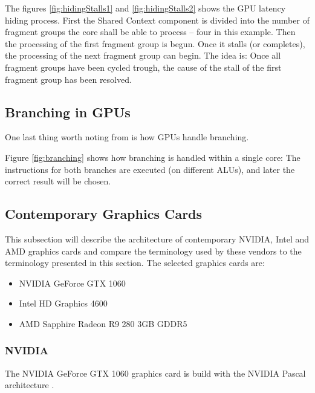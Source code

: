 The figures \ref{fig:hidingStalls1} and \ref{fig:hidingStalls2} shows the \gls{GPU} latency hiding process.
First the Shared Context component is divided into the number of fragment groups the core shall be able to process -- four in this example.
Then the processing of the first fragment group is begun. 
Once it stalls (or completes), the processing of the next fragment group can begin.
The idea is: Once all fragment groups have been cycled trough, the cause of the stall of the first fragment group has been resolved.

\subsection{Branching in \glspl{GPU}}
One last thing worth noting from \cite{intro_to_gpu_arch} is how \glspl{GPU} handle branching.


Figure \ref{fig:branching} shows how branching is handled within a single core: The instructions for both branches are executed (on different \glspl{ALU}), and later the correct result will be chosen.

\subsection{Contemporary Graphics Cards}
This subsection will describe the architecture of  contemporary NVIDIA, Intel and AMD graphics cards and compare the terminology used by these vendors to the terminology presented in this section.
The selected graphics cards are:
\begin{itemize}
	\item NVIDIA GeForce GTX 1060
	\item Intel HD Graphics 4600
	\item AMD Sapphire Radeon R9 280 3GB GDDR5
\end{itemize}

\subsubsection{NVIDIA}
The NVIDIA GeForce GTX 1060 graphics card is build with the NVIDIA Pascal architecture \cite{nvidia_gtx_1060}.


